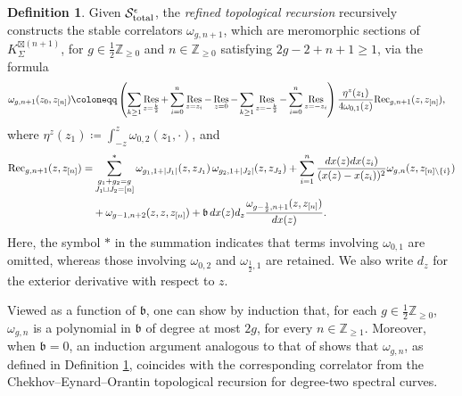 \documentclass[12pt]{amsart}
\DeclareMathOperator*{\Res}{Res}
\theoremstyle{plain}
\theoremstyle{definition}
\newtheorem{definition}[theorem]{Definition}
\theoremstyle{remark}
\numberwithin{equation}{section}
\begin{document}
\begin{definition}\label{def:RTR}
Given $\mathcal{S}^{\epsilon}_{\textup{total}}$, the \emph{refined topological recursion} recursively constructs the stable correlators $\omega_{g,n+1}$, which are meromorphic sections of $K_\Sigma^{\boxtimes (n+1)}$, for $g\in\frac12\mathbb{Z}_{\geq0}$ and $n\in\mathbb{Z}_{\geq0}$ satisfying $2g-2+n+1\geq1$, via the formula
\begin{align}
\omega_{g,n+1}(z_0,z_{[n]})\coloneqq&\left(\sum_{k\geq1}\Res_{z=\frac{k}{2}}+\sum_{i=0}^n\Res_{z=z_i}-\Res_{z=0}-\sum_{k\geq1}\Res_{z=-\frac{k}{2}}-\sum_{i=0}^n\Res_{z=-z_i}\right)\frac{\eta^z(z_1)}{4\omega_{0,1}(z)}{\rm Rec}_{g,n+1}(z,z_{[n]}),\label{RTR}
\end{align}
where $\eta^z(z_1)\coloneqq\int_{-z}^z\omega_{0,2}(z_1,\cdot)$, and
\begin{align}
{\rm Rec}_{g,n+1}(z,z_{[n]})=&\sum_{\substack{g_1+g_2=g\\J_1\sqcup J_2=[n]}}^*\omega_{g_1,1+|J_1|}(z,z_{J_1})\,\omega_{g_2,1+|J_2|}(z,z_{J_2})+\sum_{i=1}^n\frac{dx(z)dx(z_i)}{(x(z)-x(z_i))^2}\omega_{g,n}(z,z_{[n]\backslash\{i\}})\nonumber\\
&+\omega_{g-1,n+2}(z,z,z_{[n]})+\mathfrak{b}\,dx(z)d_z\frac{\omega_{g-\frac12,n+1}(z,z_{[n]})}{dx(z)}.\label{Rec}
\end{align}
Here, the symbol $*$ in the summation indicates that terms involving $\omega_{0,1}$ are omitted, whereas those involving $\omega_{0,2}$ and $\omega_{\frac12,1}$ are retained. We also write $d_z$ for the exterior derivative with respect to $z$.
\end{definition}

Viewed as a function of $\mathfrak{b}$, one can show by induction that, for each $g\in\frac12\mathbb{Z}_{\geq0}$, $\omega_{g,n}$ is a polynomial in $\mathfrak{b}$ of degree at most $2g$, for every $n\in\mathbb{Z}_{\geq1}$. Moreover, when $\mathfrak{b}=0$, an induction argument analogous to that of \cite[Lemma 3.4]{Osu23-1} shows that $\omega_{g,n}$, as defined in Definition \ref{def:RTR}, coincides with the corresponding correlator from the Chekhov--Eynard--Orantin topological recursion \cite{CE05,EO07} for degree-two spectral curves. 
\end{document}
